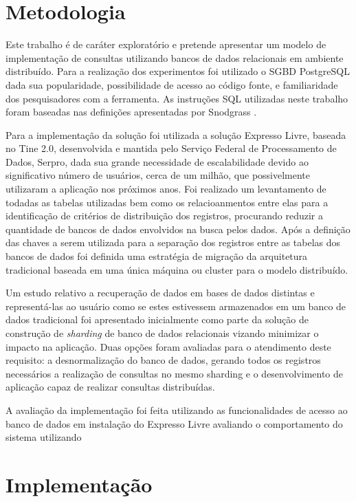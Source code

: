 \documentclass[12pt, a4paper]{article}
\begin{document}
\section{Metodologia}

Este trabalho é de caráter exploratório e pretende apresentar um modelo de implementação de consultas
utilizando bancos de dados relacionais em ambiente distribuído. Para a realização dos experimentos
foi utilizado o SGBD PostgreSQL dada sua popularidade, possibilidade de acesso ao código fonte, e 
familiaridade dos pesquisadores com a ferramenta. As instruções SQL utilizadas neste trabalho foram
baseadas nas definições apresentadas por Snodgrass \cite{snodgrass1994tsql2}. 

Para a implementação da solução foi utilizada a solução Expresso Livre, baseada no Tine 2.0, desenvolvida e 
mantida pelo Serviço Federal de Processamento de Dados, Serpro, dada sua grande necessidade de escalabilidade 
devido ao significativo número de usuários, cerca de um milhão, que possivelmente utilizaram a aplicação 
nos próximos anos. Foi realizado um levantamento de todadas as tabelas utilizadas bem como os relacioanmentos
entre elas para a identificação de critérios de distribuição dos registros, procurando reduzir a quantidade
de bancos de dados envolvidos na busca pelos dados. Após a definição das chaves a serem utilizada para 
a separação dos registros entre as tabelas dos bancos de dados foi definida uma estratégia de migração
da arquitetura tradicional baseada em uma única máquina ou cluster para o modelo distribuído.

Um estudo relativo a recuperação de dados em bases de dados distintas e representá-las ao usuário como
se estes estivessem armazenados em um banco de dados tradicional foi apresentado inicialmente como 
parte da solução de construção de \textit{sharding} de banco de dados relacionais vizando minimizar o 
impacto na aplicação. Duas opções foram avaliadas para o atendimento deste requisito:
a desnormalização do banco de dados, gerando todos os registros necessários a realização de consultas
no mesmo sharding e o desenvolvimento de aplicação capaz de realizar consultas distribuídas.

A avaliação da implementação foi feita utilizando as funcionalidades de acesso ao banco de dados
em instalação do Expresso Livre avaliando o comportamento do sistema utilizando 


\section{Implementação}
\end{document}
